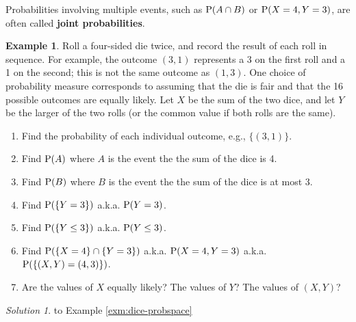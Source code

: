 \documentclass[
]{book}
\providecommand{\tightlist}{%
  \setlength{\itemsep}{0pt}\setlength{\parskip}{0pt}}
\theoremstyle{definition}
\theoremstyle{definition}
\newtheorem{example}{Example}[chapter]
\theoremstyle{definition}
\theoremstyle{remark}
\newtheorem*{solution}{Solution}
\begin{document}
Probabilities involving multiple events, such as \(\textrm{P}(A \cap B)\) or \(\textrm{P}(X=4, Y=3)\), are often called \textbf{joint probabilities}.

\begin{example}
\protect\hypertarget{exm:dice-probspace}{}{\label{exm:dice-probspace} }
Roll a four-sided die twice, and record the result of each roll in sequence. For example, the outcome \((3, 1)\) represents a 3 on the first roll and a 1 on the second; this is not the same outcome as \((1, 3)\). One choice of probability measure corresponds to assuming that the die is fair and that the 16 possible outcomes are equally likely. Let \(X\) be the sum of the two dice, and let \(Y\) be the larger of the two rolls (or the common value if both rolls are the same).
\end{example}

\begin{enumerate}
\def\labelenumi{\arabic{enumi}.}
\tightlist
\item
  Find the probability of each individual outcome, e.g., \(\{(3, 1)\}\).
\item
  Find \(\textrm{P}(A)\) where \(A\) is the event the the sum of the dice is 4.
\item
  Find \(\textrm{P}(B)\) where \(B\) is the event the the sum of the dice is at most 3.
\item
  Find \(\textrm{P}(\{Y = 3\})\) a.k.a. \(\textrm{P}(Y=3)\).
\item
  Find \(\textrm{P}(\{Y \le 3\})\) a.k.a. \(\textrm{P}( Y\le 3)\).
\item
  Find \(\textrm{P}(\{X = 4\}\cap \{Y = 3\})\) a.k.a. \(\textrm{P}(X=4, Y=3)\) a.k.a. \(\textrm{P}(\{(X,Y) = (4,3)\})\).
\item
  Are the values of \(X\) equally likely? The values of \(Y\)? The values of \((X, Y)\)?
\end{enumerate}

\begin{solution}
{}
to Example \ref{exm:dice-probspace}
\end{solution}
\end{document}
